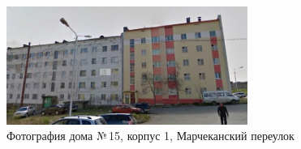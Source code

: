 \begin{figure}[h!]

    \begin{center}
    \includegraphics[width=0.7\textwidth]{authors/sydchak-fig-5.jpg}
  \end{center}
  \caption{Фотография дома №\,15, корпус 1, Марчеканский переулок}
  \label{fig:sydchak-fig-5}

\end{figure}
